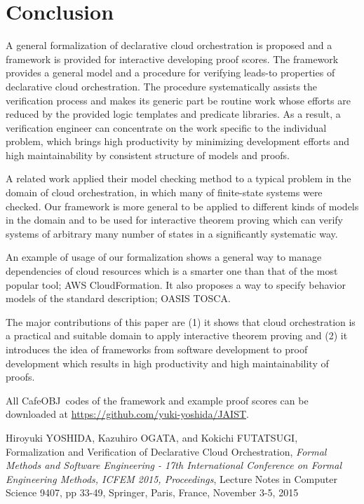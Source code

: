 \documentclass[12pt]{report}
\newcommand{\cafeobj}{{\sf CafeOBJ}~}
\begin{document}
\section{Conclusion}
A general formalization of declarative cloud orchestration is proposed
and a framework is provided for interactive developing proof
scores. The framework provides a general model and a procedure for
verifying leads-to properties of declarative cloud orchestration.  The
procedure systematically assists the verification process and makes
its generic part be routine work whose efforts are reduced by the
provided logic templates and predicate libraries. As a result, a
verification engineer can concentrate on the work specific to the
individual problem, which brings high productivity by minimizing
development efforts and high maintainability by consistent structure
of models and proofs.

A related work applied their model checking method to a typical
problem in the domain of cloud orchestration, in which many of
finite-state systems were checked. Our framework is more general to be
applied to different kinds of models in the domain and to be used for
interactive theorem proving which can verify systems of arbitrary many
number of states in a significantly systematic way.

An example of usage of our formalization shows a general way to manage
dependencies of cloud resources which is a smarter one than that of
the most popular tool; AWS CloudFormation. It also proposes a way to
specify behavior models of the standard description; OASIS TOSCA.

The major contributions of this paper are (1) it shows that cloud
orchestration is a practical and suitable domain to apply interactive
theorem proving and (2) it introduces the idea of frameworks from
software development to proof development which results in high
productivity and high maintainability of proofs.

All \cafeobj codes of the framework and example proof scores
can be downloaded at \url{https://github.com/yuki-yoshida/JAIST}.

\appendix




\begin{publication}

\item
Hiroyuki YOSHIDA, Kazuhiro OGATA, and Kokichi FUTATSUGI,
Formalization and Verification of Declarative Cloud Orchestration,
\emph{Formal Methods and Software Engineering - 17th International Conference
               on Formal Engineering Methods, {ICFEM} 2015, Proceedings}, 
Lecture Notes in Computer Science 9407,
pp 33-49, 
Springer,
Paris, France,
November 3-5, 2015

\end{publication}
\end{document}

